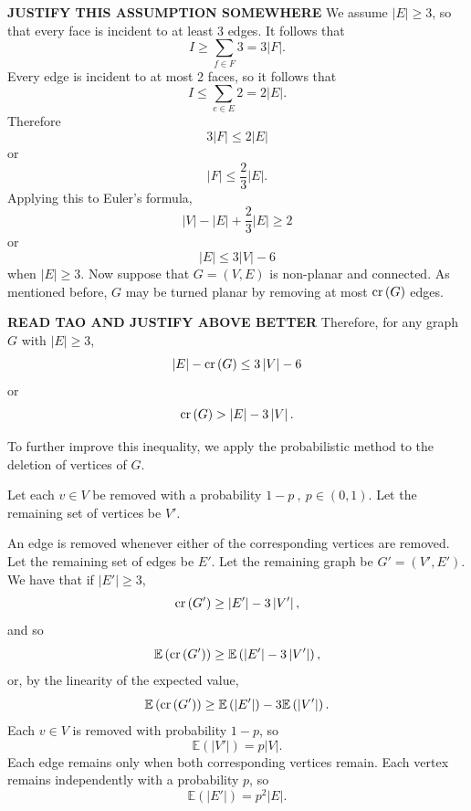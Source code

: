 \documentclass[12pt,reqno]{amsart}
\begin{document}
\textbf{JUSTIFY THIS ASSUMPTION SOMEWHERE}
We assume \(\left\lvert E \right\rvert  \geq 3\), so that every face is incident to at least 3 edges.
It follows that
\[
    I \geq \sum _{f \in F} 3 = 3 \left\lvert F \right\rvert 
.\]
Every edge is incident to at most 2 faces, so it follows that
\[
    I \leq \sum _{e \in E} 2 = 2 \left\lvert E \right\rvert 
.\]
Therefore
\[
    3 \left\lvert F \right\rvert \leq 2 \left\lvert E \right\rvert 
\]
or
\[
    \left\lvert F \right\rvert \leq \frac{2}{3} \left\lvert E \right\rvert 
.\]
Applying this to Euler's formula,
\[
    \left\lvert V \right\rvert - \left\lvert E \right\rvert + \frac{2}{3} \left\lvert E \right\rvert \geq 2
\]
or
\[
    \left\lvert E \right\rvert \leq 3 \left\lvert V \right\rvert -6
\]
when \(\left\lvert E \right\rvert \geq 3\).
Now suppose that \(G = (V,E)\) is non-planar and connected. As mentioned before, \(G\) may be turned planar by removing
at most \(\operatorname{cr}\left( G \right) \) edges.

\textbf{READ TAO AND JUSTIFY ABOVE BETTER}
Therefore, for any graph \(G\) with \(\left\lvert E \right\rvert  \geq 3\),
\[
    \left\lvert E \right\rvert - \operatorname{cr}\left( G \right) \leq 3 \left\lvert V \right\rvert - 6
\]
or
\[
    \operatorname{cr}\left( G \right) > \left\lvert E \right\rvert - 3 \left\lvert V \right\rvert 
.\]

To further improve this inequality, we apply the probabilistic method
to the deletion of vertices of \(G\).

Let each \(v \in V\) be
removed with a probability \(1-p~,~  p \in (0,1)\). Let the remaining set of vertices be \(V'\). 

An edge is
removed whenever either of the corresponding vertices are removed. Let the remaining set of edges be \(E'\). Let the remaining graph be
\(G' = (V',E')\). We have that if \(\left\lvert E' \right\rvert \geq 3\),
\[
    \operatorname{cr}\left( G' \right) \geq \left\lvert E' \right\rvert - 3 \left\lvert V' \right\rvert 
,\]
and so
\[
    \mathbb{E} \left( \operatorname{cr}\left( G' \right)  \right) \geq \mathbb{E} \left( \left\lvert E' \right\rvert - 3 \left\lvert V' \right\rvert  \right) 
,\]
or, by the linearity of the expected value,
\[
    \mathbb{E} \left( \operatorname{cr}\left( G' \right)  \right) \geq \mathbb{E} \left( \left\lvert E' \right\rvert  \right) - 3 \mathbb{E} \left( \left\lvert V' \right\rvert  \right)    
.\]
Each \(v \in V\) is removed with probability \(1-p\), so
\[
    \mathbb{E} \left( \left\lvert V' \right\rvert  \right) = p \left\lvert V \right\rvert 
.\]
Each edge remains only when both corresponding vertices remain. Each vertex remains
independently with a probability \(p\), so 
\[
    \mathbb{E} \left( \left\lvert E' \right\rvert  \right) = p^{2}\left\lvert E \right\rvert 
.\]
\end{document}
